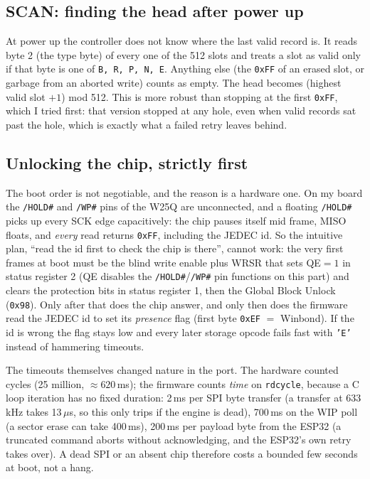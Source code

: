 \documentclass[a4paper,11pt]{article}
\begin{document}
\subsection{SCAN: finding the head after power up}

At power up the controller does not know where the last valid record is. It reads
byte 2 (the type byte) of every one of the 512 slots and treats a slot as valid only
if that byte is one of \texttt{B, R, P, N, E}. Anything else (the \texttt{0xFF} of an
erased slot, or garbage from an aborted write) counts as empty. The head becomes
(highest valid slot $+ 1$) mod 512. This is more robust than stopping at the first
\texttt{0xFF}, which I tried first: that version stopped at any hole, even when valid
records sat past the hole, which is exactly what a failed retry leaves behind.

\subsection{Unlocking the chip, strictly first}

The boot order is not negotiable, and the reason is a hardware one. On my board
the \texttt{/HOLD\#} and \texttt{/WP\#} pins of the W25Q are unconnected, and a
floating \texttt{/HOLD\#} picks up every SCK edge capacitively: the chip pauses
itself mid frame, MISO floats, and \emph{every} read returns \texttt{0xFF},
including the JEDEC id. So the intuitive plan, ``read the id first to check the
chip is there'', cannot work: the very first frames at boot must be the blind
write enable plus WRSR that sets QE$=1$ in status register 2 (QE disables the
\texttt{/HOLD\#}/\texttt{/WP\#} pin functions on this part) and clears the
protection bits in status register 1, then the Global Block Unlock
(\texttt{0x98}). Only after that does the chip answer, and only then does the
firmware read the JEDEC id to set its \emph{presence} flag (first byte
\texttt{0xEF} $=$ Winbond). If the id is wrong the flag stays low and every
later storage opcode fails fast with \texttt{'E'} instead of hammering timeouts.

The timeouts themselves changed nature in the port. The hardware counted
cycles (25 million, $\approx 620$\,ms); the firmware counts \emph{time} on
\texttt{rdcycle}, because a C loop iteration has no fixed duration: 2\,ms per
SPI byte transfer (a transfer at 633\,kHz takes 13\,$\mu$s, so this only trips
if the engine is dead), 700\,ms on the WIP poll (a sector erase can take
400\,ms), 200\,ms per payload byte from the ESP32 (a truncated command aborts
without acknowledging, and the ESP32's own retry takes over). A dead SPI or an
absent chip therefore costs a bounded few seconds at boot, not a hang.
\end{document}
